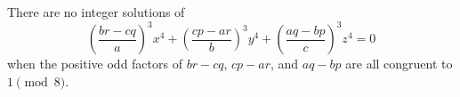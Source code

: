 \begin{proposition}
    There are no integer solutions of
\[
    \left(\frac{br-cq}{a}\right)^3x^4+\left(\frac{cp-ar}{b}\right)^3y^4+\left(\frac{aq-bp}{c}\right)^3z^4=0
\]
    when the positive odd factors of $br-cq$, $cp-ar$, and $aq-bp$ are all congruent to $1\pmod8$.
\end{proposition}
